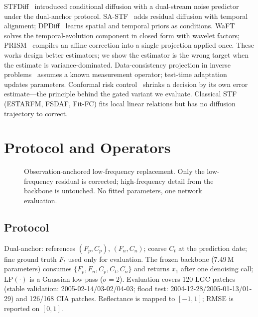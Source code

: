 \documentclass{article}
\begin{document}
STFDiff~\cite{huang2024stfdiff} introduced conditional diffusion with a dual-stream noise predictor under the dual-anchor protocol. SA-STF~\cite{zhang2026sastf} adds residual diffusion with temporal alignment; DPDiff~\cite{zhu2026dpdiff} learns spatial and temporal priors as conditions. WaFT~\cite{waft2026} solves the temporal-evolution component in closed form with wavelet factors; PRISM~\cite{prism2026} compiles an affine correction into a single projection applied once. These works design better estimators; we show the estimator is the wrong target when the estimate is variance-dominated. Data-consistency projection in inverse problems~\cite{chung2022ccdf,dcdp2026} assumes a known measurement operator; test-time adaptation~\cite{gou2024tao,tta_lst2026} updates parameters. Conformal risk control~\cite{conformal2026} shrinks a decision by its own error estimate---the principle behind the gated variant we evaluate. Classical STF (ESTARFM, FSDAF, Fit-FC) fits local linear relations but has no diffusion trajectory to correct.

\section{Protocol and Operators}
\label{sec:method}

\begin{figure}[t]
\centering
{}
\caption{Observation-anchored low-frequency replacement. Only the low-frequency residual is corrected; high-frequency detail from the backbone is untouched. No fitted parameters, one network evaluation.}
\label{fig:method}
\end{figure}

\subsection{Protocol}
Dual-anchor: references $(F_p,C_p)$, $(F_n,C_n)$; coarse $C_t$ at the prediction date; fine ground truth $F_t$ used only for evaluation. The frozen backbone (7.49\,M parameters) consumes $\{F_p,F_n,C_p,C_t,C_n\}$ and returns $x_1$ after one denoising call; $\mathrm{LP}(\cdot)$ is a Gaussian low-pass ($\sigma{=}2$). Evaluation covers 120 LGC patches (stable validation: 2005-02-14/03-02/04-03; flood test: 2004-12-28/2005-01-13/01-29) and 126/168 CIA patches. Reflectance is mapped to $[-1,1]$; RMSE is reported on $[0,1]$.
\end{document}
